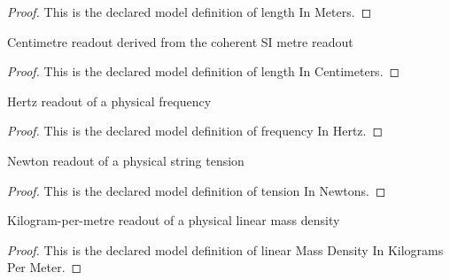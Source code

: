 \begin{proof}
  This is the declared model definition of length In Meters.
\end{proof}
\begin{definition}
  \label{def:physics:phyx-mini-0218:phyxminiproblems-problemphyxmini0218-lengthincentimeters}
  Centimetre readout derived from the coherent SI metre readout
\end{definition}
\begin{proof}
  This is the declared model definition of length In Centimeters.
\end{proof}
\begin{definition}
  \label{def:physics:phyx-mini-0218:phyxminiproblems-problemphyxmini0218-frequencyinhertz}
  Hertz readout of a physical frequency
\end{definition}
\begin{proof}
  This is the declared model definition of frequency In Hertz.
\end{proof}
\begin{definition}
  \label{def:physics:phyx-mini-0218:phyxminiproblems-problemphyxmini0218-tensioninnewtons}
  Newton readout of a physical string tension
\end{definition}
\begin{proof}
  This is the declared model definition of tension In Newtons.
\end{proof}
\begin{definition}
  \label{def:physics:phyx-mini-0218:phyxminiproblems-problemphyxmini0218-linearmassdensityinkilogramspermeter}
  Kilogram-per-metre readout of a physical linear mass density
\end{definition}
\begin{proof}
  This is the declared model definition of linear Mass Density In Kilograms Per Meter.
\end{proof}
